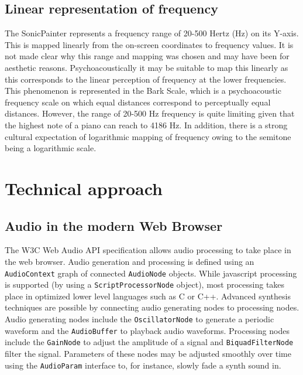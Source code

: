 \documentclass[12pt]{report}
\begin{document}
\section{Linear representation of frequency}
\label{sec:org262933f}
The SonicPainter represents a frequency range of 20-500 Hertz (Hz) on its
Y-axis. This is mapped linearly from the on-screen coordinates to frequency
values. It is not made clear why this range and mapping was chosen and may have
been for aesthetic reasons. Psychoacoustically it may be suitable to map this
linearly as this corresponds to the linear perception of frequency at the lower
frequencies. This phenomenon is represented in the Bark Scale, which is a
psychoacoustic frequency scale on which equal distances correspond to
perceptually equal distances. However, the range of 20-500 Hz frequency is quite
limiting given that the highest note of a piano can reach to 4186 Hz. In
addition, there is a strong cultural expectation of logarithmic mapping of
frequency owing to the semitone being a logarithmic scale.

\chapter{Technical approach}
\label{sec:orgd79ead1}
\section{Audio in the modern Web Browser}
\label{sec:org812b131}
The W3C Web Audio API specification allows audio processing to take place in the
web browser. Audio generation and processing is defined using an \texttt{AudioContext}
graph of connected \texttt{AudioNode} objects. While javascript processing is supported
(by using a \texttt{ScriptProcessorNode} object), most processing takes place in
optimized lower level languages such as C or C++. Advanced synthesis techniques
are possible by connecting audio generating nodes to processing nodes. Audio
generating nodes include the \texttt{OscillatorNode} to generate a periodic waveform
and the \texttt{AudioBuffer} to playback audio waveforms. Processing nodes include the
\texttt{GainNode} to adjust the amplitude of a signal and \texttt{BiquadFilterNode} filter the
signal. Parameters of these nodes may be adjusted smoothly over time using the
\texttt{AudioParam} interface to, for instance, slowly fade a synth sound in.
\end{document}
